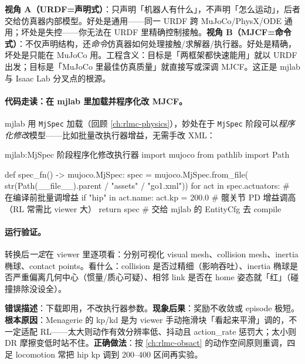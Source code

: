 \begin{insight}\label{ins:rlmc-assets-decl-imp}
\textbf{视角 A（URDF=声明式）}：只声明「机器人有什么」，不声明「怎么运动」，后者交给仿真器内部模型。好处是通用——同一 URDF 跨 MuJoCo/PhysX/ODE 通用；坏处是失控——你无法在 URDF 里精确控制接触。\textbf{视角 B（MJCF=命令式）}：不仅声明结构，还\emph{命令}仿真器如何处理接触/求解器/执行器。好处是精确，坏处是只能在 MuJoCo 用。工程含义：目标是「两框架都快速能用」就以 URDF 出发；目标是「MuJoCo 里最佳仿真质量」就直接写或深调 MJCF。这正是 mjlab 与 Isaac Lab 分叉点的根源。
\end{insight}

\paragraph{代码走读：在 mjlab 里加载并程序化改 MJCF。}mjlab 用 \texttt{MjSpec} 加载（回顾 \cref{ch:rlmc-physics}），妙处在于 \texttt{MjSpec} 阶段可以\emph{程序化修改}模型——比如批量改执行器增益，无需手改 XML：

\begin{codebox}[Python]{mjlab:MjSpec 阶段程序化修改执行器}
import mujoco
from pathlib import Path

def spec_fn() -> mujoco.MjSpec:
    spec = mujoco.MjSpec.from_file(
        str(Path(__file__).parent / "assets" / "go1.xml"))
    for act in spec.actuators:          # 在编译前批量调增益
        if "hip" in act.name:
            act.kp = 200.0              # 髋关节 PD 增益调高（RL 常需比 viewer 大）
    return spec                          # 交给 mjlab 的 EntityCfg 去 compile
\end{codebox}

\paragraph{运行验证。}转换后\emph{一定}在 viewer 里逐项看：分别可视化 visual mesh、collision mesh、inertia 椭球、contact points。看什么：collision 是否过精细（影响吞吐）、inertia 椭球是否严重偏离几何中心（惯量/质心可疑）、相邻 link 是否在 home 姿态就「红」（碰撞排除没设全）。

\begin{pitfall}
\textbf{错误描述}：下载即用，不改执行器参数。\textbf{现象后果}：奖励不收敛或 episode 极短。\textbf{根本原因}：Menagerie 的 kp/kd 是为 viewer 手动拖滑块「看起来平滑」调的，不一定适配 RL——太大则动作有效分辨率低、抖动且 action\_rate 惩罚大；太小则 DR 摩擦变低时站不住。\textbf{正确做法}：按 \cref{ch:rlmc-obsact} 的动作空间原则重调，四足 locomotion 常把 hip kp 调到 200--400 区间再实验。
\end{pitfall}

